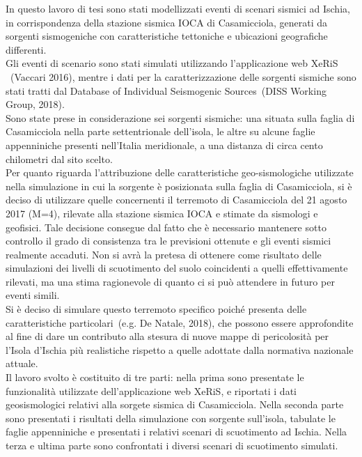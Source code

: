 \documentclass[a4paper,12pt,titlepage]{article}
\begin{document}
In questo lavoro di tesi sono stati modellizzati eventi di scenari sismici ad Ischia, in corrispondenza della stazione sismica IOCA di Casamicciola, generati da sorgenti sismogeniche con caratteristiche tettoniche e ubicazioni geografiche differenti.\\
Gli eventi di scenario sono stati simulati utilizzando l'applicazione web XeRiS  ~\nocite{Vaccari2016}(Vaccari 2016), mentre i dati per la caratterizzazione delle sorgenti sismiche sono stati tratti dal Database of Individual Seismogenic Sources~\nocite{DISS}(DISS Working Group, 2018).\\
Sono state prese in considerazione sei sorgenti sismiche: una situata sulla faglia di Casamicciola nella parte settentrionale dell'isola, le altre su alcune faglie appenniniche presenti nell'Italia meridionale, a una distanza di circa cento chilometri dal sito scelto.\\
Per quanto riguarda l'attribuzione delle caratteristiche geo-sismologiche utilizzate nella simulazione in cui la sorgente è posizionata sulla faglia di
Casamicciola, si è deciso di utilizzare quelle concernenti il terremoto di Casamicciola del 21 agosto 2017 (M=4), rilevate alla stazione sismica IOCA e
stimate da sismologi e geofisici. Tale decisione consegue dal fatto che è necessario mantenere sotto controllo il grado di consistenza tra le previsioni
ottenute e gli eventi sismici realmente accaduti. Non si avrà la pretesa di ottenere come risultato delle simulazioni dei livelli di scuotimento del suolo coincidenti a quelli effettivamente rilevati, ma una stima ragionevole di quanto ci si può attendere in futuro per eventi simili.\\
Si è deciso di simulare questo terremoto specifico poiché presenta delle caratteristiche particolari~\nocite{DeNatale2018}(e.g. De Natale, 2018), che possono essere approfondite al fine di dare un contributo alla stesura di nuove mappe di pericolosità per l'Isola d'Ischia più realistiche rispetto a quelle adottate dalla normativa nazionale attuale.\\
Il lavoro svolto è costituito di tre parti: nella prima sono presentate le funzionalità utilizzate dell'applicazione web XeRiS, e riportati i dati geosismologici relativi alla sorgete sismica di Casamicciola. Nella seconda parte sono presentati i risultati della simulazione con sorgente sull'isola, tabulate le faglie appenniniche e presentati i relativi scenari di scuotimento ad Ischia. Nella terza e ultima parte sono confrontati i diversi scenari di scuotimento simulati.
\end{document}
